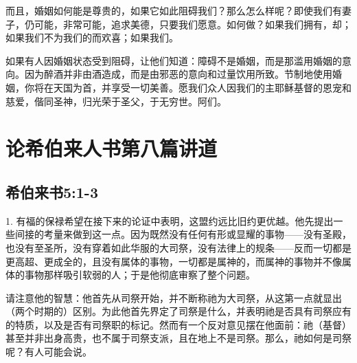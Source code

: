而且，婚姻如何能是尊贵的，如果它如此阻碍我们？那么怎么样呢？即使我们有妻子，仍可能，非常可能，追求美德，只要我们愿意。如何做？如果我们拥有，却；如果我们不为我们的而欢喜；如果我们。\par

如果有人因婚姻状态受到阻碍，让他们知道：障碍不是婚姻，而是那滥用婚姻的意向。因为醉酒并非由酒造成，而是由邪恶的意向和过量饮用所致。节制地使用婚姻，你将在天国为首，并享受一切美善。愿我们众人因我们的主耶稣基督的恩宠和慈爱，偕同圣神，归光荣于圣父，于无穷世。阿们。\par



\section{论希伯来人书第八篇讲道}


\subsection{希伯来书5:1-3}

\par

1. 有福的保禄希望在接下来的论证中表明，这盟约远比旧约更优越。他先提出一些间接的考量来做到这一点。因为既然没有任何有形或显耀的事物——没有圣殿，也没有至圣所，没有穿着如此华服的大司祭，没有法律上的规条——反而一切都是更高超、更成全的，且没有属体的事物，一切都是属神的，而属神的事物并不像属体的事物那样吸引软弱的人；于是他彻底审察了整个问题。\par

请注意他的智慧：他首先从司祭开始，并不断称祂为大司祭，从这第一点就显出（两个时期的）区别。为此他首先界定了司祭是什么，并表明祂是否具有司祭应有的特质，以及是否有司祭职的标记。然而有一个反对意见摆在他面前：祂（基督）甚至并非出身高贵，也不属于司祭支派，且在地上不是司祭。那么，祂如何是司祭呢？有人可能会说。\par

